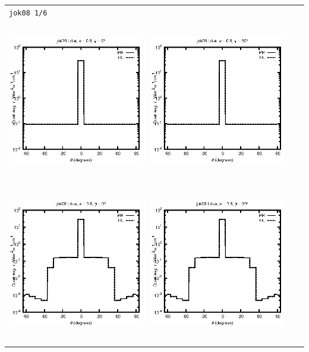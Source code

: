 \begin{tabular}{c c c c}
\multicolumn{4}{l}{\texttt{jok08 1/6}} \\
\includegraphics[height=7cm]{../eps/jok08_Ld_a_fwd.eps} &
\includegraphics[height=7cm]{../eps/jok08_Ld_a_cross.eps}\\
\includegraphics[height=7cm]{../eps/jok08_Ld_w_fwd.eps} &
\includegraphics[height=7cm]{../eps/jok08_Ld_w_cross.eps} \\

\end{tabular}
